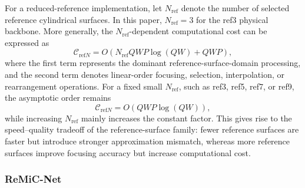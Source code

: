 \documentclass[journal]{IEEEtran}
\begin{document}
For a reduced-reference implementation, let $N_{\mathrm{ref}}$ denote the number of selected reference cylindrical surfaces. In this paper, $N_{\mathrm{ref}}=3$ for the ref3 physical backbone. More generally, the $N_{\mathrm{ref}}$-dependent computational cost can be expressed as
\begin{equation}
    \mathcal{C}_{\mathrm{ref}N}
    = O\left(N_{\mathrm{ref}}QWP\log(QW)+QWP\right),
    \label{eq:refN_complexity}
\end{equation}
where the first term represents the dominant reference-surface-domain processing, and the second term denotes linear-order focusing, selection, interpolation, or rearrangement operations. For a fixed small $N_{\mathrm{ref}}$, such as ref3, ref5, ref7, or ref9, the asymptotic order remains
\begin{equation}
    \mathcal{C}_{\mathrm{ref}N}
    = O\left(QWP\log(QW)\right),
\end{equation}
while increasing $N_{\mathrm{ref}}$ mainly increases the constant factor. This gives rise to the speed--quality tradeoff of the reference-surface family: fewer reference surfaces are faster but introduce stronger approximation mismatch, whereas more reference surfaces improve focusing accuracy but increase computational cost.

\subsubsection{ReMiC-Net}
\end{document}
